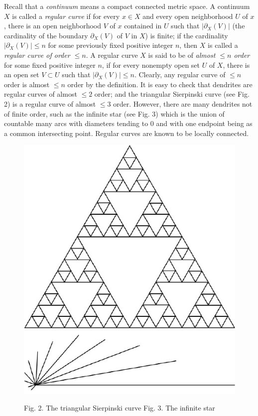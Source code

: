 \documentclass[12pt,a4paper]{amsart}
\theoremstyle{definition}
\numberwithin{equation}{section}
\begin{document}
Recall that a {\it continuum} means a compact connected metric space.
A continuum $X$ is called a
{\it regular curve} if for every $x\in X$ and every open neighborhood $U$ of $x$, there is an open neighborhood
$V$ of $x$ contained in $U$ such that  $|\partial_X(V)|$ (the cardinality of the boundary $\partial_X(V)$ of $V$ in $X$) is finite; if the cardinality$|\partial_X(V)|\leq n$ for some
previously fixed positive integer $n$, then $X$ is called a {\it regular curve of order $\leq n$}.
 A regular curve $X$ is said to be of {\it almost $\leq n$ order} for some fixed positive
integer $n$, if for every nonempty open set $U$ of $X$, there is an open set $V\subset U$ such that $|\partial_X(V)|\leq n$.
Clearly, any regular curve of $\leq n$ order is almost $\leq n$ order by the definition.
It is easy to check that dendrites are regular curves of almost $\leq 2$ order; and the triangular Sierpinski
curve (see Fig. 2) is a regular curve of almost $\leq 3$ order. However, there are many dendrites not of finite order, such as
the infinite star (see Fig. 3) which is the union of countable many arcs with diameters tending to $0$ and with one endpoint being as a common intersecting point. Regular curves are known to be locally connected.

\begin{figure}%
\centering
\includegraphics[scale=0.6]{triangular.pdf} \hspace{1cm}
\includegraphics[scale=0.8]{star.pdf}
\centerline{Fig. 2. The triangular Sierpinski curve \hspace{2.5cm} Fig. 3. The infinite star \hspace{2cm}}
\end{figure}
\end{document}
